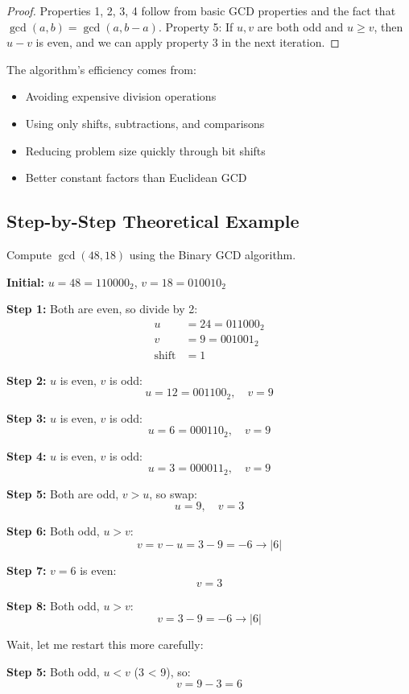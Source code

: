 \documentclass[12pt,a4paper]{article}
\theoremstyle{definition}
\begin{document}
\begin{proof}
Properties 1, 2, 3, 4 follow from basic GCD properties and the fact that $\gcd(a, b) = \gcd(a, b-a)$.
Property 5: If $u, v$ are both odd and $u \geq v$, then $u - v$ is even, and we can apply property 3 in the next iteration.
\end{proof}

The algorithm's efficiency comes from:
\begin{itemize}
    \item Avoiding expensive division operations
    \item Using only shifts, subtractions, and comparisons
    \item Reducing problem size quickly through bit shifts
    \item Better constant factors than Euclidean GCD
\end{itemize}

\subsection{Step-by-Step Theoretical Example}

Compute $\gcd(48, 18)$ using the Binary GCD algorithm.

\textbf{Initial:} $u = 48 = 110000_2$, $v = 18 = 010010_2$

\textbf{Step 1:} Both are even, so divide by 2:
\begin{align}
u &= 24 = 011000_2\\
v &= 9 = 001001_2\\
\text{shift} &= 1
\end{align}

\textbf{Step 2:} $u$ is even, $v$ is odd:
\[u = 12 = 001100_2, \quad v = 9\]

\textbf{Step 3:} $u$ is even, $v$ is odd:
\[u = 6 = 000110_2, \quad v = 9\]

\textbf{Step 4:} $u$ is even, $v$ is odd:
\[u = 3 = 000011_2, \quad v = 9\]

\textbf{Step 5:} Both are odd, $v > u$, so swap:
\[u = 9, \quad v = 3\]

\textbf{Step 6:} Both odd, $u > v$:
\[v = v - u = 3 - 9 = -6 \rightarrow |6|\]

\textbf{Step 7:} $v = 6$ is even:
\[v = 3\]

\textbf{Step 8:} Both odd, $u > v$:
\[v = 3 - 9 = -6 \rightarrow |6|\]

Wait, let me restart this more carefully:

\textbf{Step 5:} Both odd, $u < v$ (3 < 9), so:
\[v = 9 - 3 = 6\]
\end{document}
